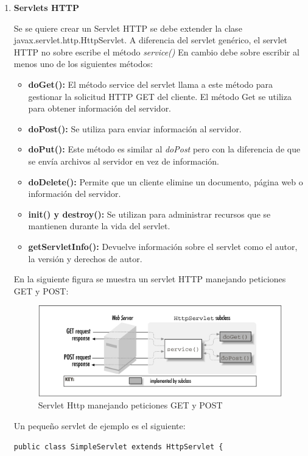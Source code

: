 \documentclass[a4paper,12pt]{article}
\begin{document}
\begin{enumerate}
 \item \textbf{Servlets HTTP}
 
 Se se quiere crear un Servlet HTTP se debe extender la clase javax.servlet.http.HttpServlet. A diferencia del servlet genérico, el servlet HTTP no sobre escribe
 el método \textit{service()} En cambio debe sobre escribir al menos uno de los siguientes métodos:
 
 \begin{itemize}
  \item \textbf{doGet():} El método service del servlet llama a este método para gestionar la solicitud HTTP GET del cliente. El método Get se utiliza para obtener
  información del servidor.
  \item \textbf{doPost():} Se utiliza para enviar información al servidor.
  \item \textbf{doPut():} Este método es similar al \textit{doPost} pero con la diferencia de que se envía archivos al servidor en vez de información.
  \item \textbf{doDelete():} Permite que un cliente elimine un documento, página web o información del servidor.
  \item \textbf{init() y destroy():} Se utilizan para administrar recursos que se mantienen durante la vida del servlet.
  \item \textbf{getServletInfo():} Devuelve información sobre el servlet como el autor, la versión y derechos de autor.
 \end{itemize}

 En la siguiente figura se muestra un servlet HTTP manejando peticiones GET y POST:
 
 \begin{figure}[H]
  \centering
  \includegraphics[scale = 0.7]{2.png}
  \caption{Servlet Http manejando peticiones GET y POST}
 \end{figure}
 
 Un pequeño servlet de ejemplo es el siguiente:
 
 \begin{lstlisting}
public class SimpleServlet extends HttpServlet {


\end{lstlisting}
\end{enumerate}
\end{document}
